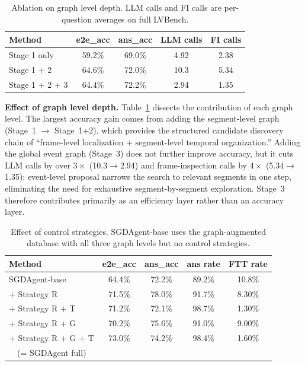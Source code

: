 \documentclass[sigconf, screen, review, anonymous]{acmart}
\begin{document}


\begin{table}[!tb]
  \centering
  \caption{Ablation on graph level depth. LLM calls and FI calls
           are per-question averages on full LVBench.}
   \vspace{-0.1in}
  \label{tab:tiers}
  \begin{tabular*}{\columnwidth}{l@{\extracolsep{\fill}}cccc}
    \toprule
    Method & e2e\_acc & ans\_acc & LLM calls & FI calls \\
    \midrule
    Stage 1 only          & 59.2\% & 69.0\% & 4.92 & 2.38 \\
    Stage 1 + 2           & 64.6\% & 72.0\% & 10.3 & 5.34  \\
    Stage 1 + 2 + 3       & 64.4\% & 72.2\% & 2.94  & 1.35  \\
    \bottomrule
  \end{tabular*}
\end{table}

\textbf{Effect of graph level depth.}
Table~\ref{tab:tiers} dissects the contribution of each graph level.  The
largest accuracy gain comes from adding the segment-level graph (Stage~1
$\to$ Stage~1+2), which provides the structured candidate discovery
chain of ``frame-level localization + segment-level temporal
organization.''  Adding the global event graph (Stage~3) does not further
improve accuracy, but it cuts LLM calls by over $3\times$ (10.3$\to$2.94) and
frame-inspection calls by $4\times$ (5.34$\to$1.35): event-level proposal
narrows the search to relevant segments in one step, eliminating the
need for exhaustive segment-by-segment exploration.  Stage~3 therefore
contributes primarily as an efficiency layer rather than an accuracy
layer.




\begin{table}[!tb]
  \centering
  \caption{Effect of control strategies. SGDAgent-base uses the graph-augmented database with all three
           graph levels but no control strategies.}
  \vspace{-0.1in}
  \label{tab:strategy}
  \begin{tabular}{lcccc}
    \toprule
    Method & e2e\_acc & ans\_acc & ans rate & FTT rate \\
    \midrule
    SGDAgent-base          & 64.4\% & 72.2\% & 89.2\% & 10.8\% \\
    + Strategy R           & 71.5\% & 78.0\% & 91.7\% & 8.30\%  \\
    + Strategy R + T           & 71.2\% & 72.1\% & 98.7\% & 1.30\% \\
    + Strategy R + G           & 70.2\% & 75.6\% & 91.0\% & 9.00\% \\
    + Strategy R + G + T       & 73.0\% & 74.2\% & 98.4\% & 1.60\%  \\
    ~~(= SGDAgent full)    &        &        &        &        \\
    \bottomrule
  \end{tabular}
\end{table}
\end{document}
